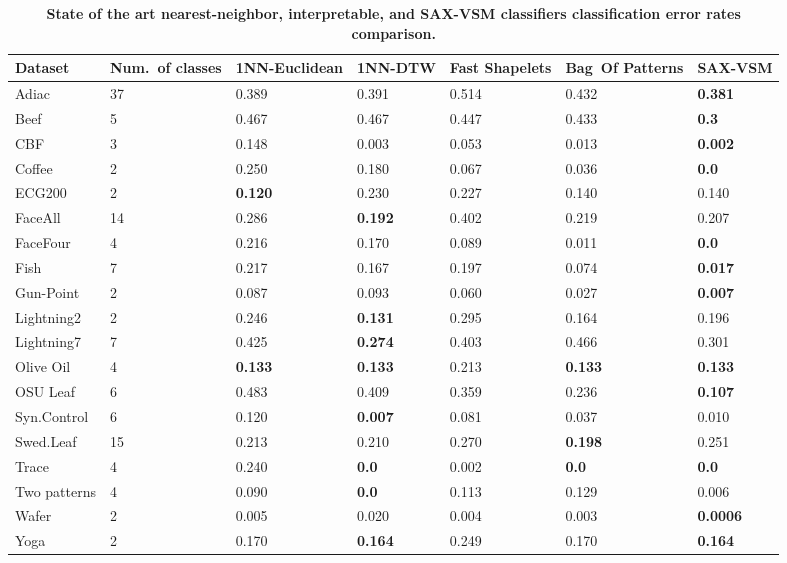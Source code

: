 \begin{table}[t!]
\captionsetup{justification=centering}
\caption{\bf State of the art nearest-neighbor, interpretable, and \mbox{SAX-VSM} classifiers classification error rates comparison.}
 \label{perf_table1}
{\setlength{\extrarowheight}{1.5pt}%
{\footnotesize
\begin{tabularx}{\linewidth}{@{} l *6X @{}}
\hline
Dataset & \mbox{Num. of} classes & 1NN-Euclidean & 1NN-DTW & Fast Shapelets &  \mbox{Bag Of} \mbox{Patterns}
& SAX-VSM\\
\hline
Adiac        &37  & 0.389   & 0.391  & 0.514  & 0.432  & \textbf{0.381}\\
Beef         &5   & 0.467   & 0.467  & 0.447  & 0.433 & \textbf{0.3}\\
CBF         & 3  & 0.148    & 0.003  & 0.053    & 0.013 & \textbf{0.002} \\
Coffee       &2    & 0.250   & 0.180  & 0.067     & 0.036     & \textbf{0.0} \\
ECG200     &2   & \textbf{0.120}  & 0.230  & 0.227     & 0.140   & 0.140 \\
FaceAll      &14  & 0.286   & \textbf{0.192}  & 0.402     & 0.219   & 0.207\\
FaceFour    &4   & 0.216   & 0.170  & 0.089     & 0.011   & \textbf{0.0} \\
Fish         &7   & 0.217   & 0.167  & 0.197    & 0.074   & \textbf{0.017} \\
Gun-Point    &2   & 0.087   & 0.093  & 0.060     & 0.027     & \textbf{0.007} \\
Lightning2    &2   & 0.246   & \textbf{0.131}  & 0.295  & 0.164  & 0.196 \\
Lightning7    &7   & 0.425   & \textbf{0.274}  & 0.403  & 0.466  & 0.301 \\
Olive Oil     &4   & \textbf{0.133}   & \textbf{0.133}  & 0.213     & \textbf{0.133}  & \textbf{0.133}\\
OSU Leaf    &6   & 0.483   & 0.409  & 0.359     & 0.236  & \textbf{0.107} \\
Syn.Control  &6   & 0.120   & \textbf{0.007}  & 0.081     & 0.037  & 0.010 \\
Swed.Leaf   &15  & 0.213   & 0.210 & 0.270 & \textbf{0.198} & 0.251 \\
Trace       &4   & 0.240   & \textbf{0.0}    & 0.002  & \textbf{0.0} & \textbf{0.0} \\
Two patterns &4   & 0.090   & \textbf{0.0}    & 0.113   & 0.129      & 0.006 \\
Wafer        &2    & 0.005   & 0.020     & 0.004  & 0.003 & \textbf{0.0006} \\
Yoga        &2    & 0.170   & \textbf{0.164}  & 0.249 & 0.170 & \textbf{0.164} \\
\hline
\end{tabularx}
}}
\end{table}

